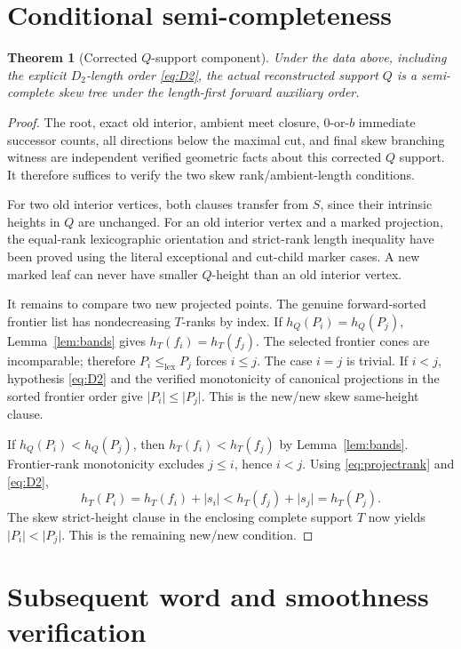 \documentclass[11pt]{article}
\newtheorem{theorem}{Theorem}
\newcommand{\htT}{h_T}
\newcommand{\htQ}{h_Q}
\newcommand{\lex}{\le_{\mathrm{lex}}}
\newcommand{\len}[1]{\lvert #1\rvert}
\begin{document}
\section*{Conditional semi-completeness}

\begin{theorem}[Corrected \(Q\)-support component]
\label{thm:Q}
Under the data above, including the explicit
\(D_2\)-length order \eqref{eq:D2},
the actual reconstructed support \(Q\) is a
semi-complete skew tree under the
length-first \emph{forward} auxiliary order.
\end{theorem}

\begin{proof}
The root, exact old interior, ambient meet closure,
\(0\)-or-\(b\) immediate successor counts, all
directions below the maximal cut, and final skew
branching witness are independent verified geometric
facts about this corrected \(Q\) support.
It therefore suffices to verify the two skew
rank/ambient-length conditions.

For two old interior vertices, both clauses transfer
from \(S\), since their intrinsic heights in \(Q\)
are unchanged. For an old interior vertex and a
marked projection, the equal-rank lexicographic
orientation and strict-rank length inequality
have been proved using the literal exceptional and
cut-child marker cases. A new marked leaf can never
have smaller \(Q\)-height than an old interior vertex.

It remains to compare two new projected points.
The genuine forward-sorted frontier list has
nondecreasing \(T\)-ranks by index.
If \(\htQ(P_i)=\htQ(P_j)\), Lemma~\ref{lem:bands}
gives \(\htT(f_i)=\htT(f_j)\).
The selected frontier cones are incomparable;
therefore \(P_i\lex P_j\) forces \(i\le j\).
The case \(i=j\) is trivial. If \(i<j\),
hypothesis \eqref{eq:D2} and the verified
monotonicity of canonical projections in the
sorted frontier order give
\(\len{P_i}\le\len{P_j}\).
This is the new/new skew same-height clause.

If \(\htQ(P_i)<\htQ(P_j)\), then
\(\htT(f_i)<\htT(f_j)\) by
Lemma~\ref{lem:bands}. Frontier-rank
monotonicity excludes \(j\le i\), hence \(i<j\).
Using \eqref{eq:projectrank} and \eqref{eq:D2},
\[
 \htT(P_i)=\htT(f_i)+\len{s_i}
         <\htT(f_j)+\len{s_j}
         =\htT(P_j).
\]
The skew strict-height clause in the enclosing
complete support \(T\) now yields
\(\len{P_i}<\len{P_j}\).
This is the remaining new/new condition.
\end{proof}


\section*{Subsequent word and smoothness verification}
\end{document}
